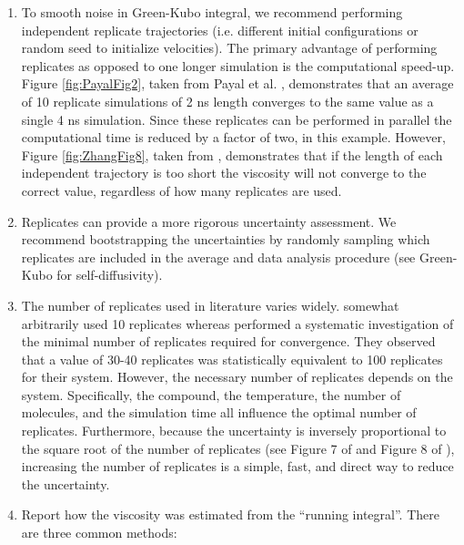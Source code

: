 \documentclass[9pt]{livecoms}
\begin{document}
\begin{enumerate}
	\item To smooth noise in Green-Kubo integral, we recommend performing independent replicate trajectories (i.e. different initial configurations or random seed to initialize velocities). The primary advantage of performing replicates as opposed to one longer simulation is the computational speed-up. Figure \ref{fig:PayalFig2}, taken from Payal et al. \cite{Payal2012}, demonstrates that an average of 10 replicate simulations of 2 ns length converges to the same value as a single 4 ns simulation. Since these replicates can be performed in parallel the computational time is reduced by a factor of two, in this example. However, Figure \ref{fig:ZhangFig8}, taken from \cite{Zhang2015}, demonstrates that if the length of each independent trajectory is too short the viscosity will not converge to the correct value, regardless of how many replicates are used.
	\item Replicates can provide a more rigorous uncertainty assessment. We recommend bootstrapping the uncertainties by randomly sampling which replicates are included in the average and data analysis procedure (see Green-Kubo for self-diffusivity).
	\item The number of replicates used in literature varies widely. \cite{Payal2012} somewhat arbitrarily used 10 replicates whereas \cite{Zhang2015} performed a systematic investigation of the minimal number of replicates required for convergence. They observed that a value of 30-40 replicates was statistically equivalent to 100 replicates for their system. However, the necessary number of replicates depends on the system. Specifically, the compound, the temperature, the number of molecules, and the simulation time all influence the optimal number of replicates. Furthermore, because the uncertainty is inversely proportional to the square root of the number of replicates (see Figure 7 of \cite{Zhang2015} and Figure 8 of \cite{Ma2017}), increasing the number of replicates is a simple, fast, and direct way to reduce the uncertainty.
	\item Report how the viscosity was estimated from the ``running integral''. There are three common methods:
	\begin{enumerate}

\end{enumerate}
\end{enumerate}
\end{document}
